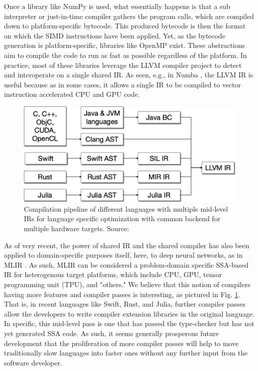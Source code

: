\documentclass{IEEEtran}
\begin{document}
Once a library like NumPy is used, what essentially happens is that a sub interpreter or just-in-time compiler gathers the program calls, which are compiled down to platform-specific bytecode. This produced bytecode is then the format on which the SIMD instructions have been applied. Yet, as the bytecode generation is platform-specific, libraries like OpenMP exist. These abstractions aim to compile the code to run as fast as possible regardless of the platform. In practice, most of these libraries leverage the \gls{LLVM} compiler project to detect and interoperate on a single shared \gls{IR}. As seen, e.g., in Numba \cite{lam2015numba}, the LLVM IR is useful because as in some cases, it allows a single IR to be compiled to vector instruction accelerated \gls{CPU} and \gls{GPU} code.

\begin{figure}
  \centering
  \includegraphics[width=\columnwidth]{mlir.png}
  \caption{Compilation pipeline of different languages with multiple mid-level IRs for language specific optimization with common backend for multiple hardware targets. Source: \cite{lattner2020mlir}}
  \label{fig:mlir}
\end{figure}

As of very recent, the power of shared IR and the shared compiler has also been applied to domain-specific purposes itself, here, to deep neural networks, as in MLIR \cite{lattner2020mlir}. As such, MLIR can be considered a problem-domain specific \gls{SSA}-based IR for heterogenous target platforms, which include CPU, GPU, tensor programming unit (TPU), and "others." We believe that this notion of compilers having more features and compiler passes is interesting, as pictured in Fig. \ref{fig:mlir}. That is, in recent languages like Swift, Rust, and Julia, further compiler passes allow the developers to write compiler extension libraries in the original language. In specific, this mid-level pass is one that has passed the type-checker but has not yet generated SSA code. As such, it seems generally prosperous future development that the proliferation of more compiler passes will help to move traditionally slow languages into faster ones without any further input from the software developer.
\end{document}
